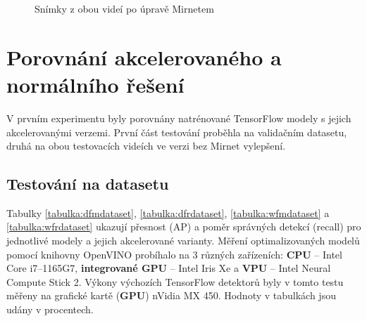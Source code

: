 \begin{figure}[H] 
  \begin{center}
  \label{obrazek:videamirnet}
  \caption{Snímky z obou videí po úpravě Mirnetem}
  \end{center}
\end{figure}

\section{Porovnání akcelerovaného a normálního řešení}
V prvním experimentu byly porovnány natrénované TensorFlow modely s jejich akcelerovanými verzemi. První část testování proběhla na validačním datasetu, druhá na obou testovacích videích ve verzi bez Mirnet vylepšení.

\subsection*{Testování na datasetu}
Tabulky \ref{tabulka:dfmdataset}, \ref{tabulka:dfrdataset}, \ref{tabulka:wfmdataset} a \ref{tabulka:wfrdataset} ukazují přesnost (AP) a poměr správných detekcí (recall) pro jednotlivé modely a jejich akcelerované varianty. Měření optimalizovaných modelů pomocí knihovny OpenVINO probíhalo na 3 různých zařízeních: \textbf{CPU} -- Intel Core i7--1165G7, \textbf{integrované GPU} -- Intel Iris Xe a \textbf{VPU} -- Intel Neural Compute Stick 2. Výkony výchozích TensorFlow detektorů byly v tomto testu měřeny na grafické kartě (\textbf{GPU}) nVidia MX 450. Hodnoty v tabulkách jsou udány v procentech.

